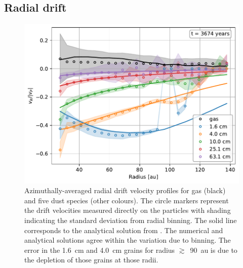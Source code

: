 \documentclass[fleqn,usenatbib]{mnras}
\begin{document}
\subsection{Radial drift}%
\label{subsec:radialdrift}

\begin{figure}
   \begin{center}
      \includegraphics[width=\columnwidth]{figs/radialdrift.pdf}
      \caption{Azimuthally-averaged radial drift velocity profiles for gas
      (black) and five dust species (other colours). The circle markers
      represent the drift velocities measured directly on the particles with
      shading indicating the standard deviation from radial binning. The solid
      line corresponds to the analytical solution from
      \citet{Dipierro2018MNRAS.479.4187D}. The numerical and analytical
      solutions agree within the variation due to binning. The error in the
      1.6~cm and 4.0~cm grains for radius \(\gtrsim\)~90~au is due to the
      depletion of those grains at those radii.%
      \label{fig:radialdrift}}
   \end{center}
\end{figure}
\end{document}
